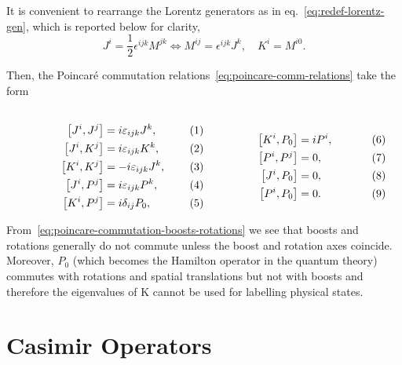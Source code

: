 It is convenient to rearrange the Lorentz generators as in eq.~\eqref{eq:redef-lorentz-gen}, which is reported below for clarity,
\begin{equation}
    J^i = \frac{1}{2} \epsilon^{ijk} M^{jk} \iff M^{ij} = \epsilon^{ijk} J^k, \quad K^i = M^{i0} .
\end{equation}

Then, the Poincaré commutation relations~\eqref{eq:poincare-comm-relations} take the form

\begin{subequations}
\label{eq:poincare-commutation-boosts-rotations}
\noindent\centering
    \begin{minipage}{0.48\textwidth}
        \begin{align}
        \comm{J^i}{J^j} &= i \epsilon_{ijk} J^k, \\
        \comm{J^i}{K^j} &= i \epsilon_{ijk} K^k ,\\
        \comm{K^i}{K^j} &= -i \epsilon_{ijk} J^k, \\
        \comm{J^i}{P^j} &= i \epsilon_{ijk} P^k ,\\
        \comm{K^i}{P^j} &= i \delta_{ij} P_0,
        \end{align}
    \end{minipage}
    \hfill
    \begin{minipage}{0.48\textwidth}
    \label{eq:bell_states}
        \begin{align}
        \comm{K^i}{P_0} &= i P^i ,\\
        \comm{P^i}{P^j} &= 0, \\
        \comm{J^i}{P_0} &= 0, \\
        \comm{P^i}{P_0} &= 0 .
        \end{align}
    \end{minipage}\bigskip
    \end{subequations}

From~\eqref{eq:poincare-commutation-boosts-rotations} we see that boosts and rotations generally do not commute unless the boost and rotation axes coincide. Moreover, $P_0$ (which becomes the Hamilton operator in the quantum theory) commutes with rotations and spatial translations but not with boosts and therefore the eigenvalues of K cannot be used for labelling physical states.


\section{Casimir Operators}

